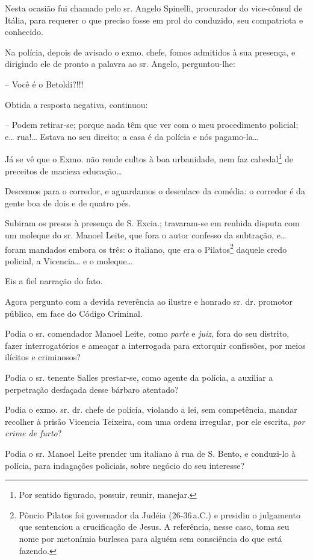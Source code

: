 Nesta ocasião fui chamado pelo sr. Angelo Spinelli, procurador do
vice-cônsul de Itália, para requerer o que preciso fosse em prol do
conduzido, seu compatriota e conhecido.

Na polícia, depois de avisado o exmo. chefe, fomos admitidos à sua
presença, e dirigindo ele de pronto a palavra ao sr. Angelo,
perguntou-lhe:

-- Você é o Betoldi?!!!

Obtida a resposta negativa, continuou:

-- Podem retirar-se; porque nada têm que ver com o meu procedimento
policial; e\ldots{} rua!\ldots{} Estava no seu direito; a casa é da polícia e nós
pagamo-la\ldots{}

Já se vê que o Exmo. não rende cultos à boa urbanidade, nem faz
cabedal\footnote{ Por sentido figurado, possuir, reunir, manejar.} de
preceitos de macieza educação\ldots{}

Descemos para o corredor, e aguardamos o desenlace da comédia: o
corredor é da gente boa de dois e de quatro pés.

Subiram os presos à presença de S. Excia.; travaram-se em renhida
disputa com um moleque do sr. Manoel Leite, que fora o autor confesso da
subtração, e\ldots{} foram mandados embora os três: o italiano, que era o
Pilatos\footnote{ Pôncio Pilatos foi governador da Judéia (26-36\,a.C.) e
  presidiu o julgamento que sentenciou a crucificação de Jesus. A
  referência, nesse caso, toma seu nome por metonímia burlesca para
  alguém sem consciência do que está fazendo.} daquele credo policial, a
Vicencia\ldots{} e o moleque\ldots{}

Eis a fiel narração do fato.

Agora pergunto com a devida reverência ao ilustre e honrado sr. dr.
promotor público, em face do Código Criminal.

Podia o sr. comendador Manoel Leite, como \emph{parte} e \emph{juiz},
fora do seu distrito, fazer interrogatórios e ameaçar a interrogada para
extorquir confissões, por meios ilícitos e criminosos?

Podia o sr. tenente Salles prestar-se, como agente da polícia, a
auxiliar a perpetração desfaçada desse bárbaro atentado?

Podia o exmo. sr. dr. chefe de polícia, violando a lei, sem competência,
mandar recolher à prisão Vicencia Teixeira, com uma ordem irregular, por
ele escrita, \emph{por crime de furto}?

Podia o sr. Manoel Leite prender um italiano à rua de S. Bento, e
conduzi-lo à polícia, para indagações policiais, sobre negócio do seu
interesse?

